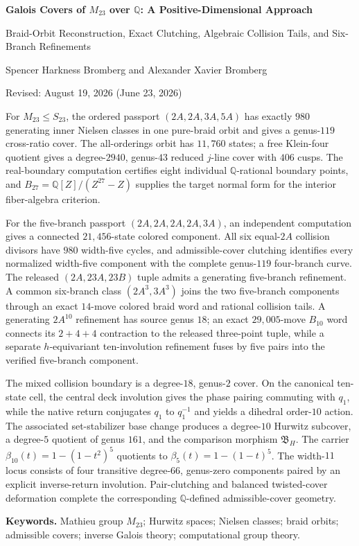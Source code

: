 \documentclass[10pt]{article}
\newcommand{\Q}{\mathbb Q}
\begin{document}
\begin{center}
{\large\bfseries Galois Covers of $M_{23}$ over $\mathbb Q$: A Positive-Dimensional Approach\par}
\vspace{0.12em}
{\small Braid-Orbit Reconstruction, Exact Clutching, Algebraic Collision Tails, and Six-Branch Refinements\par}
\vspace{0.25em}
{\small Spencer Harkness Bromberg and Alexander Xavier Bromberg\par}
{\footnotesize Revised: August 19, 2026 (June 23, 2026)\par}
\end{center}
\vspace{0.18em}
For $M_{23}\leq S_{23}$, the ordered passport $(2A,2A,3A,5A)$ has exactly $980$ generating inner Nielsen classes in one pure-braid orbit and gives a genus-$119$ cross-ratio cover.  The all-orderings orbit has $11{,}760$ states; a free Klein-four quotient gives a degree-$2940$, genus-$43$ reduced $j$-line cover with $406$ cusps.  The real-boundary computation certifies eight individual $\Q$-rational boundary points, and $B_{27}=\Q[Z]/(Z^{27}-Z)$ supplies the target normal form for the interior fiber-algebra criterion.

For the five-branch passport $(2A,2A,2A,2A,3A)$, an independent computation gives a connected $21{,}456$-state colored component.  All six equal-$2A$ collision divisors have $980$ width-five cycles, and admissible-cover clutching identifies every normalized width-five component with the complete genus-$119$ four-branch curve.  The released $(2A,23A,23B)$ tuple admits a generating five-branch refinement.  A common six-branch class $(2A^3,3A^3)$ joins the two five-branch components through an exact $14$-move colored braid word and rational collision tails.  A generating $2A^{10}$ refinement has source genus $18$; an exact $29{,}005$-move $B_{10}$ word connects its $2+4+4$ contraction to the released three-point tuple, while a separate $h$-equivariant ten-involution refinement fuses by five pairs into the verified five-branch component.

The mixed collision boundary is a degree-$18$, genus-$2$ cover.  On the canonical ten-state cell, the central deck involution gives the phase pairing commuting with $q_1$, while the native return conjugates $q_1$ to $q_1^{-1}$ and yields a dihedral order-$10$ action.  The associated set-stabilizer base change produces a degree-$10$ Hurwitz subcover, a degree-$5$ quotient of genus $161$, and the comparison morphism $\mathfrak B_H$.  The carrier $\beta_{10}(t)=1-(1-t^2)^5$ quotients to $\beta_5(t)=1-(1-t)^5$.  The width-$11$ locus consists of four transitive degree-$66$, genus-zero components paired by an explicit inverse-return involution.  Pair-clutching and balanced twisted-cover deformation complete the corresponding $\Q$-defined admissible-cover geometry.

\noindent\textbf{Keywords.} Mathieu group $M_{23}$; Hurwitz spaces; Nielsen classes; braid orbits; admissible covers; inverse Galois theory; computational group theory.
\end{document}
